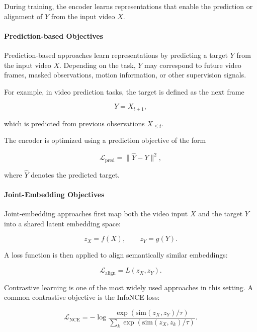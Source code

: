 During training, the encoder learns representations that enable the prediction 
or alignment of $Y$ from the input video $X$.

\paragraph{Prediction-based Objectives}

Prediction-based approaches learn representations by predicting a target $Y$ 
from the input video $X$. Depending on the task, $Y$ may correspond to future 
video frames, masked observations, motion information, or other supervision signals.

For example, in video prediction tasks, the target is defined as the next frame

\[
Y = X_{t+1},
\]

which is predicted from previous observations $X_{\leq t}$.

The encoder is optimized using a prediction objective of the form

\[
\mathcal{L}_{\text{pred}}
=
\| \hat{Y} - Y \|^2,
\]

where $\hat{Y}$ denotes the predicted target.

\paragraph{Joint-Embedding Objectives}

Joint-embedding approaches first map both the video input $X$ and the target $Y$ 
into a shared latent embedding space:

\[
z_X = f(X),
\qquad
z_Y = g(Y).
\]

A loss function is then applied to align semantically similar embeddings:

\[
\mathcal{L}_{\text{align}}
=
L(z_X, z_Y).
\]

Contrastive learning is one of the most widely used approaches in this setting. 
A common contrastive objective is the InfoNCE loss:

\[
\mathcal{L}_{\text{NCE}}
=
-
\log
\frac{
\exp(\mathrm{sim}(z_X, z_Y)/\tau)
}{
\sum_k
\exp(\mathrm{sim}(z_X, z_k)/\tau)
}.
\]























